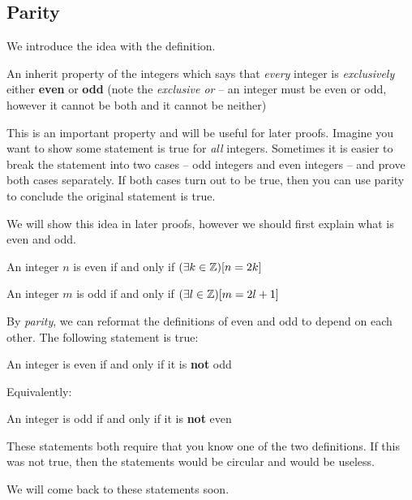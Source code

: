 \documentclass[main.tex]{subfiles}
\begin{document}
\subsection{Parity}

We introduce the idea with the definition.

\begin{defn}
	An inherit property of the integers which says that \textit{every} integer is \textit{exclusively} either \textbf{even} or \textbf{odd} (note the \textit{exclusive or} -- an integer must be even or odd, however it cannot be both and it cannot be neither)
\end{defn}

This is an important property and will be useful for later proofs. Imagine you want to show some statement is true for \textit{all} integers. Sometimes it is easier to break the statement into two cases -- odd integers and even integers -- and prove both cases separately. If both cases turn out to be true, then you can use parity to conclude the original statement is true.

We will show this idea in later proofs, however we should first explain what is even and odd.

\begin{defn}
	An integer \(n\) is even if and only if \((\exists k \in \mathbb{Z})[n = 2k]\)
\end{defn}

\begin{defn}
	An integer \(m\) is odd if and only if \((\exists l \in \mathbb{Z})[m = 2l + 1]\)
\end{defn}

By \textit{parity}, we can reformat the definitions of even and odd to depend on each other. The following statement is true:

\begin{center}
	An integer is even if and only if it is \textbf{not} odd
\end{center}

Equivalently:

\begin{center}
	An integer is odd if and only if it is \textbf{not} even
\end{center}

These statements both require that you know one of the two definitions. If this was not true, then the statements would be circular and would be useless.

We will come back to these statements soon.
\end{document}
